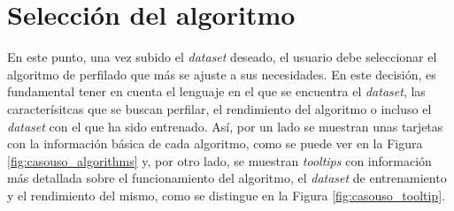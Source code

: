 \section{Selección del algoritmo}

En este punto, una vez subido el \textit{dataset} deseado, el usuario debe seleccionar el algoritmo de perfilado que más se ajuste
a sus necesidades. En este decisión, es fundamental tener en cuenta el lenguaje en el que se encuentra el \textit{dataset},
las caracterísitcas que se buscan perfilar, el rendimiento del algoritmo o incluso el \textit{dataset} con el que ha sido entrenado.
Así, por un lado se muestran unas tarjetas con la información básica de cada algoritmo, como se puede ver
en la Figura \ref{fig:casouso_algorithms} y, por otro lado, se muestran \textit{tooltips} con información más detallada
sobre el funcionamiento del algoritmo, el \textit{dataset} de entrenamiento y el rendimiento del mismo, 
como se distingue en la Figura \ref{fig:casouso_tooltip}.

